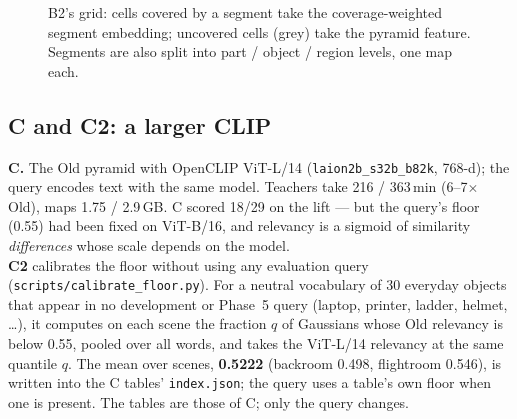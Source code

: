 \documentclass[11pt,a4paper]{article}
\newcommand{\code}[1]{\texttt{#1}}
\begin{document}
\begin{figure}[ht]
\centering
{}
\caption{B2's grid: cells covered by a segment take the coverage-weighted segment embedding; uncovered cells (grey) take
the pyramid feature. Segments are also split into part / object / region levels, one map each.}
\end{figure}

\subsection{C and C2: a larger CLIP}
\textbf{C.} The Old pyramid with OpenCLIP ViT-L/14 (\code{laion2b\_s32b\_b82k}, 768-d); the query encodes text with the
same model. Teachers take 216 / 363\,min (6--7$\times$ Old), maps 1.75 / 2.9\,GB. C scored 18/29 on the lift ---
but the query's floor (0.55) had been fixed on ViT-B/16, and relevancy is a sigmoid of similarity \emph{differences}
whose scale depends on the model.\\
\textbf{C2} calibrates the floor without using any evaluation query (\code{scripts/calibrate\_floor.py}). For a neutral
vocabulary of 30 everyday objects that appear in no development or Phase~5 query (laptop, printer, ladder, helmet,
\dots), it computes on each scene the fraction $q$ of Gaussians whose Old relevancy is below 0.55, pooled over all words,
and takes the ViT-L/14 relevancy at the same quantile $q$. The mean over scenes, \textbf{0.5222} (backroom 0.498,
flightroom 0.546), is written into the C tables' \code{index.json}; the query uses a table's own floor when one is
present. The tables are those of C; only the query changes.
\end{document}
